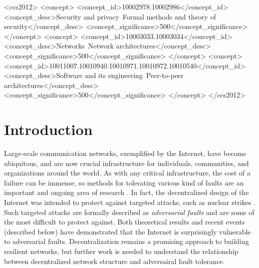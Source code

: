 \documentclass{sig-alternate-05-2015}
\begin{document}
%
%
\begin{CCSXML}
<ccs2012>
<concept>
<concept_id>10002978.10002986</concept_id>
<concept_desc>Security and privacy~Formal methods and theory of security</concept_desc>
<concept_significance>500</concept_significance>
</concept>
<concept>
<concept_id>10003033.10003034</concept_id>
<concept_desc>Networks~Network architectures</concept_desc>
<concept_significance>500</concept_significance>
</concept>
<concept>
<concept_id>10011007.10010940.10010971.10010972.10010540</concept_id>
<concept_desc>Software and its engineering~Peer-to-peer architectures</concept_desc>
<concept_significance>500</concept_significance>
</concept>
</ccs2012>
\end{CCSXML} 


%
%

%
%
\printccsdesc



\section{Introduction}

Large-scale communication networks, exemplified by the Internet,
have become ubiquitous, and are now crucial infrastructure for
individuals, communities, and organizations around the world.
As with any critical infrastructure, the cost of a failure can be
immense, so methods for tolerating various kind of faults are an
important and ongoing area of research
\cite{zin_survey_2015,albert_error_2000,sterbenz_resilience_2010}.
In fact, the decentralized design of the Internet was intended to protect
against targeted attacks, such as nuclear strikes
\cite{baran_distributed_1964}.
Such targeted attacks are formally described as {\em adversarial faults}
and are some of the most difficult to protect against.
Both theoretical results and recent events (described below)
have demonstrated that
the Internet is surprisingly vulnerable to adversarial faults.
Decentralization remains a promising approach to building resilient networks,
but further work is needed to understand the relationship between
decentralized network structure and adversairal fault tolerance.
\end{document}
